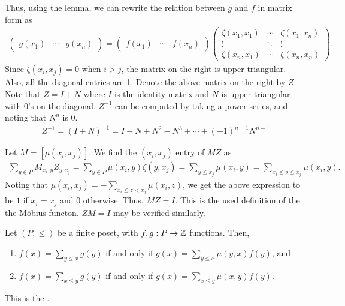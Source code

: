 Thus, using the lemma, we can rewrite the relation between $g$ and $f$ in matrix form as
\begin{align}
    \begin{pmatrix}
        g(x_{1}) & \cdots & g(x_{n})
    \end{pmatrix} = \begin{pmatrix}
        f(x_{1}) & \cdots & f(x_{n})
    \end{pmatrix} \begin{pmatrix}
        \zeta(x_{1},x_{1}) & \cdots & \zeta(x_{1},x_{n}) \\
        \vdots & \ddots & \vdots \\
        \zeta(x_{n},x_{1}) & \cdots & \zeta(x_{n},x_{n})
    \end{pmatrix}.
\end{align}
Since $\zeta(x_{i},x_{j}) = 0$ when $i > j$, the matrix on the right is upper triangular. Also, all the diagonal entries are 1. Denote the above matrix on the right by $Z$. Note that $Z = I+N$ where $I$ is the identity matrix and $N$ is upper triangular with $0$'s on the diagonal. $Z^{-1}$ can be computed by taking a power series, and noting that $N^{n}$ is $0$.
\begin{align}
    Z^{-1} = (I+N)^{-1} = I-N+N^{2}-N^{3} + \cdots + (-1)^{n-1}N^{n-1}
\end{align}

Let $M = [\mu(x_{i},x_{j})]$. We find the $(x_{i},x_{j})$ entry of $MZ$ as
\begin{align}
    \sum_{y \in P} M_{x_{i},y} Z_{y,x_{j}} = \sum_{y \in P} \mu(x_{i},y) \zeta(y,x_{j}) = \sum_{y \leq x_{j}} \mu(x_{i},y) = \sum_{x_{i} \leq y \leq x_{j}} \mu(x_{i},y).
\end{align}
Noting that $\mu(x_{i},x_{j}) = -\sum_{x_{i} \leq z < x_{j}} \mu(x_{i},z)$, we get the above expression to be $1$ if $x_{i} = x_{j}$ and $0$ otherwise. Thus, $MZ = I$. This is the used definition of the the M\"obius functon. $ZM = I$ may be verified similarly.


\begin{theorem}
    Let $(P,\leq)$ be a finite poset, with $f,g:P \to \mathbb{Z}$ functions. Then,
    \begin{enumerate}
        \item $f(x) = \sum_{y \leq x} g(y)$ if and only if $g(x) = \sum_{y \leq x} \mu(y,x) f(y)$, and
        \item $f(x) = \sum_{x \leq y} g(y)$ if and only if $g(x) = \sum_{x \leq y} \mu(x,y)f(y)$. 
    \end{enumerate}
    This is the .
\end{theorem}

